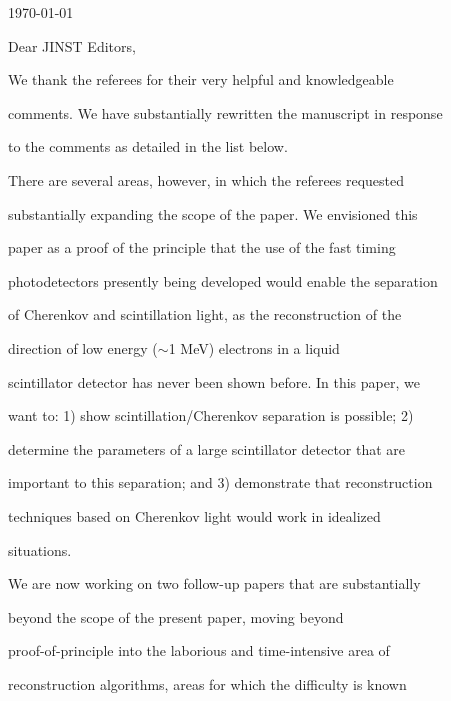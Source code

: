 \documentclass[11pt]{article}
\begin{document}
\begin{flushright}

\today

\end{flushright}




Dear JINST Editors,\\



\parindent 1.0in



We thank the referees for their very helpful and knowledgeable

comments. We have substantially rewritten the manuscript in response 

to the comments as detailed in the list below. 



There are several areas, however, in which the referees requested

substantially expanding the scope of the paper.  We envisioned this

paper as a proof of  the principle that the use of the fast timing

photodetectors presently being developed would enable the separation

of Cherenkov and scintillation light, as the reconstruction of the

direction of low energy ($\sim$1 MeV) electrons in a liquid

scintillator detector has never been shown before.  In this paper, we

want to: 1) show scintillation/Cherenkov separation is possible; 2)

determine the parameters of a large scintillator detector that are

important to this separation; and 3) demonstrate that reconstruction

techniques based on Cherenkov light would work in idealized

situations.



We are now working on two follow-up papers that are substantially

beyond the scope of the present paper, moving beyond

proof-of-principle into the laborious and time-intensive area of

reconstruction algorithms, areas for which the difficulty is known
\end{document}
